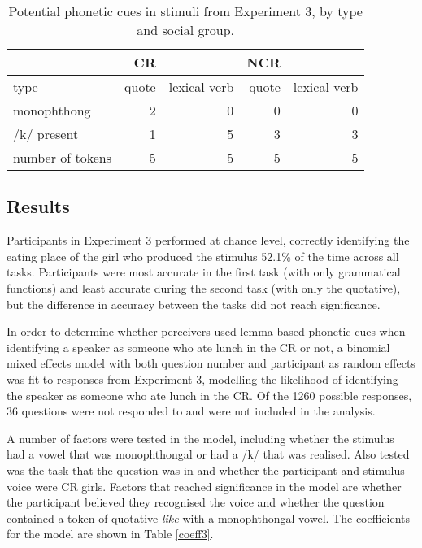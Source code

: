 \begin{table}[ht]
\begin{center}
\begin{tabular}{lrrrr}
  \hline
     
     	 						&	CR 		&			& NCR &  \\
  	 	  \hline
type						& quote & lexical verb 	\vline& quote & lexical verb   \\
monophthong 		&  2 & 0 \vline&  0 & 0 \\
/k/ present 		&  1 & 5 \vline& 3 & 3  \\
number of tokens	& 5 & 5 \vline&  5 & 5 \\


   \hline
   
\end{tabular}
\caption{Potential phonetic cues in stimuli from Experiment 3, by type and social group.}\label{tab:cues3}
\end{center}
\end{table}	


  

\subsection{Results}

Participants in Experiment 3 performed at chance level, correctly identifying the eating place of the girl who produced the stimulus 52.1\% of the time across all tasks.  Participants were most accurate in the first task (with only grammatical functions) and least accurate during the second task (with only the quotative), but the difference in accuracy between the tasks did not reach significance.  

In order to determine whether perceivers used lemma-based phonetic cues when identifying a speaker as someone who ate lunch in the CR or not, a binomial mixed effects model with both question number and participant as random effects was fit to responses from Experiment 3, modelling the likelihood of identifying the speaker as someone who ate lunch in the CR.  Of the 1260 possible responses, 36 questions were not responded to and were not included in the analysis.

A number of factors were tested in the model, including whether the stimulus had a vowel that was monophthongal or had a /k/ that was realised.  Also tested was the task that the question was in and whether the participant and stimulus voice were CR girls.  Factors that reached significance in the model are whether the participant believed they recognised the voice and whether the question contained a token of quotative \textit{like} with a monophthongal vowel.  The coefficients for the model are shown in Table \ref{coeff3}. 



